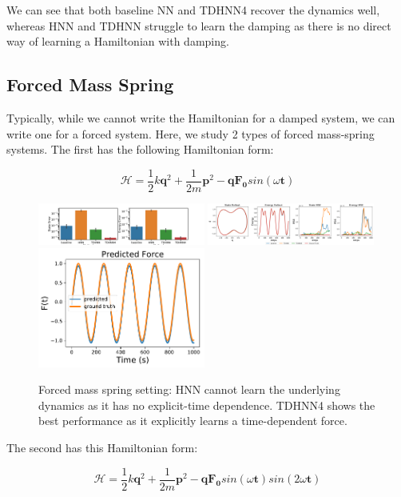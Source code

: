 \documentclass[twoside]{article}
\begin{document}
We can see that both baseline NN and TDHNN4 recover the dynamics well, whereas HNN and TDHNN struggle to learn the damping as there is no direct way of learning a Hamiltonian with damping.

\subsection{Forced Mass Spring}

Typically, while we cannot write the Hamiltonian for a damped system, we can write one for a forced system. Here, we study 2 types of forced mass-spring systems. The first has the following Hamiltonian form:

\begin{equation}
\mathcal{H} = \frac{1}{2}k\mathbf{q}^2 + \frac{1}{2m}\mathbf{p}^2 - \mathbf{q}\mathbf{F_0}sin(\omega \mathbf{t}) 
\end{equation}

\begin{figure}[h!]
\centering
\includegraphics[width=0.49\textwidth]{figures/mass_spring_forced_1_errors.pdf}
\includegraphics[width=0.49\textwidth]{figures/mass_spring_forced_1_pred.pdf}
\includegraphics[width=0.49\textwidth]{figures/TDHNN4_mass_spring_force_1.pdf}
\caption{Forced mass spring setting: HNN cannot learn the underlying dynamics as it has no explicit-time dependence. TDHNN4 shows the best performance as it explicitly learns a time-dependent force.}
\end{figure}

The second has this Hamiltonian form:

\begin{equation}
\mathcal{H} = \frac{1}{2}k\mathbf{q}^2 + \frac{1}{2m}\mathbf{p}^2 - \mathbf{q}\mathbf{F_0}sin(\omega \mathbf{t})sin(2\omega \mathbf{t})
\end{equation}
\end{document}
